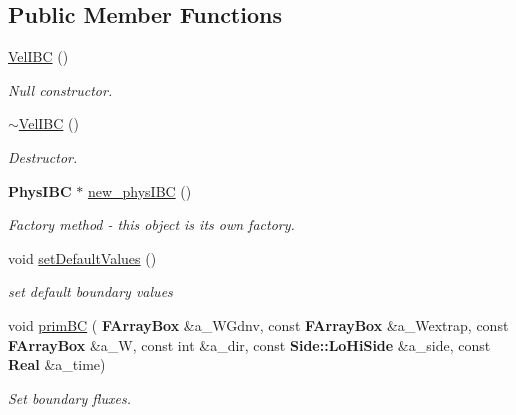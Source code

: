 \subsection*{Public Member Functions}
\begin{DoxyCompactItemize}
\item 
\mbox{\label{class_vel_i_b_c_a5823ec0d34fc039346f6f5970ac20393}} 
\hyperlink{class_vel_i_b_c_a5823ec0d34fc039346f6f5970ac20393}{Vel\+I\+BC} ()
\begin{DoxyCompactList}\small\item\em Null constructor. \end{DoxyCompactList}\item 
\mbox{\label{class_vel_i_b_c_a4b4e45d8bcd831ee73e360ca953fc3e3}} 
\hyperlink{class_vel_i_b_c_a4b4e45d8bcd831ee73e360ca953fc3e3}{$\sim$\+Vel\+I\+BC} ()
\begin{DoxyCompactList}\small\item\em Destructor. \end{DoxyCompactList}\item 
\textbf{ Phys\+I\+BC} $\ast$ \hyperlink{class_vel_i_b_c_ac53daf9706542e3fa4734c8701f5fff5}{new\+\_\+phys\+I\+BC} ()
\begin{DoxyCompactList}\small\item\em Factory method -\/ this object is its own factory. \end{DoxyCompactList}\item 
\mbox{\label{class_vel_i_b_c_a67c793da1efebd887de7b0c7907b7e5b}} 
void \hyperlink{class_vel_i_b_c_a67c793da1efebd887de7b0c7907b7e5b}{set\+Default\+Values} ()
\begin{DoxyCompactList}\small\item\em set default boundary values \end{DoxyCompactList}\item 
\mbox{\label{class_vel_i_b_c_a30d5d96e3f384b7fa82d919a424c7847}} 
void \hyperlink{class_vel_i_b_c_a30d5d96e3f384b7fa82d919a424c7847}{prim\+BC} (\textbf{ F\+Array\+Box} \&a\+\_\+\+W\+Gdnv, const \textbf{ F\+Array\+Box} \&a\+\_\+\+Wextrap, const \textbf{ F\+Array\+Box} \&a\+\_\+W, const int \&a\+\_\+dir, const \textbf{ Side\+::\+Lo\+Hi\+Side} \&a\+\_\+side, const \textbf{ Real} \&a\+\_\+time)
\begin{DoxyCompactList}\small\item\em Set boundary fluxes. \end{DoxyCompactList}\item 

\end{DoxyCompactItemize}
